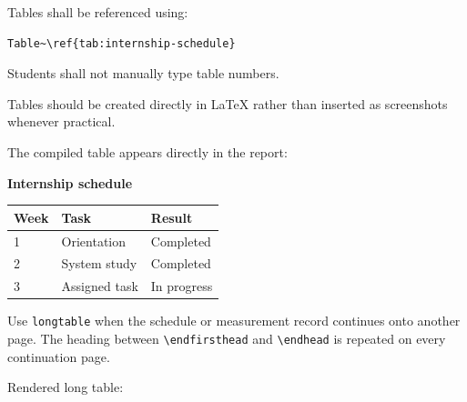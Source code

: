 {Tables shall be referenced using:

\begin{verbatim}
Table~\ref{tab:internship-schedule}
\end{verbatim}

Students shall not manually type table numbers.

Tables should be created directly in \LaTeX{} rather than inserted as
screenshots whenever practical.



\RegExample The compiled table appears directly in the report:

\begin{center}
\textbf{Internship schedule}\par\smallskip
\begin{tabular}{|l|l|l|}
    \hline
    Week & Task & Result \\
    \hline
    1 & Orientation & Completed \\
    2 & System study & Completed \\
    3 & Assigned task & In progress \\
    \hline
\end{tabular}
\end{center}


Use \verb|longtable| when the schedule or measurement record continues
onto another page. The heading between \verb|\endfirsthead| and
\verb|\endhead| is repeated on every continuation page.

\RegExample Rendered long table:

}
